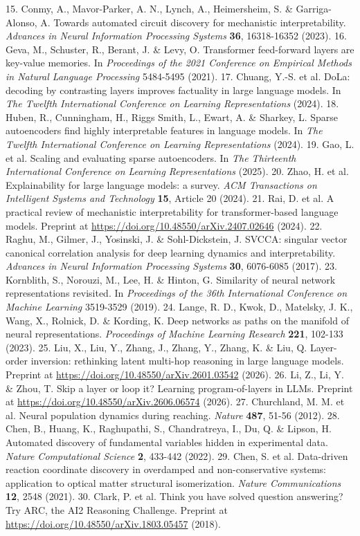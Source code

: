 \documentclass[12pt]{article}
\begin{document}
15. Conmy, A., Mavor-Parker, A. N., Lynch, A., Heimersheim, S. \& Garriga-Alonso, A. Towards automated circuit discovery for mechanistic interpretability. \emph{Advances in Neural Information Processing Systems} \textbf{36}, 16318-16352 (2023).
16. Geva, M., Schuster, R., Berant, J. \& Levy, O. Transformer feed-forward layers are key-value memories. In \emph{Proceedings of the 2021 Conference on Empirical Methods in Natural Language Processing} 5484-5495 (2021).
17. Chuang, Y.-S. et al. DoLa: decoding by contrasting layers improves factuality in large language models. In \emph{The Twelfth International Conference on Learning Representations} (2024).
18. Huben, R., Cunningham, H., Riggs Smith, L., Ewart, A. \& Sharkey, L. Sparse autoencoders find highly interpretable features in language models. In \emph{The Twelfth International Conference on Learning Representations} (2024).
19. Gao, L. et al. Scaling and evaluating sparse autoencoders. In \emph{The Thirteenth International Conference on Learning Representations} (2025).
20. Zhao, H. et al. Explainability for large language models: a survey. \emph{ACM Transactions on Intelligent Systems and Technology} \textbf{15}, Article 20 (2024).
21. Rai, D. et al. A practical review of mechanistic interpretability for transformer-based language models. Preprint at \url{https://doi.org/10.48550/arXiv.2407.02646} (2024).
22. Raghu, M., Gilmer, J., Yosinski, J. \& Sohl-Dickstein, J. SVCCA: singular vector canonical correlation analysis for deep learning dynamics and interpretability. \emph{Advances in Neural Information Processing Systems} \textbf{30}, 6076-6085 (2017).
23. Kornblith, S., Norouzi, M., Lee, H. \& Hinton, G. Similarity of neural network representations revisited. In \emph{Proceedings of the 36th International Conference on Machine Learning} 3519-3529 (2019).
24. Lange, R. D., Kwok, D., Matelsky, J. K., Wang, X., Rolnick, D. \& Kording, K. Deep networks as paths on the manifold of neural representations. \emph{Proceedings of Machine Learning Research} \textbf{221}, 102-133 (2023).
25. Liu, X., Liu, Y., Zhang, J., Zhang, Y., Zhang, K. \& Liu, Q. Layer-order inversion: rethinking latent multi-hop reasoning in large language models. Preprint at \url{https://doi.org/10.48550/arXiv.2601.03542} (2026).
26. Li, Z., Li, Y. \& Zhou, T. Skip a layer or loop it? Learning program-of-layers in LLMs. Preprint at \url{https://doi.org/10.48550/arXiv.2606.06574} (2026).
27. Churchland, M. M. et al. Neural population dynamics during reaching. \emph{Nature} \textbf{487}, 51-56 (2012).
28. Chen, B., Huang, K., Raghupathi, S., Chandratreya, I., Du, Q. \& Lipson, H. Automated discovery of fundamental variables hidden in experimental data. \emph{Nature Computational Science} \textbf{2}, 433-442 (2022).
29. Chen, S. et al. Data-driven reaction coordinate discovery in overdamped and non-conservative systems: application to optical matter structural isomerization. \emph{Nature Communications} \textbf{12}, 2548 (2021).
30. Clark, P. et al. Think you have solved question answering? Try ARC, the AI2 Reasoning Challenge. Preprint at \url{https://doi.org/10.48550/arXiv.1803.05457} (2018).
\end{document}
